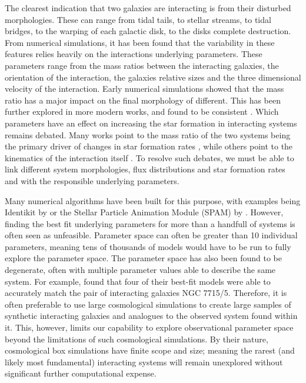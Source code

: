 The clearest indication that two galaxies are interacting is from their disturbed morphologies. These can range from tidal tails, to stellar streams, to tidal bridges, to the warping of each galactic disk, to the disks complete destruction. From numerical simulations, it has been found that the variability in these features relies heavily on the interactions underlying parameters. These parameters range from the mass ratios between the interacting galaxies, the orientation of the interaction, the galaxies relative sizes and the three dimensional velocity of the interaction. Early numerical simulations \citep[e.g][]{Toomre_72, White_78_Read, Wallin_90, Hernquist_93} showed that the mass ratio has a major impact on the final morphology of different. This has been further explored in more modern works, and found to be consistent \citep{Bournaud_05,Lotz_08, 2012ApJ...747...85X, 2023PASJ...75..986T}. Which parameters have an effect on increasing the star formation in interacting systems remains debated. Many works point to the mass ratio of the two systems being the primary driver of changes in star formation rates \citep{Knapen_15b, 2022MNRAS.516.4922R, 2023ApJ...953...91L}, while others point to the kinematics of the interaction itself \citep{2020MNRAS.499.4370M, Xu_21}. To resolve such debates, we must be able to link different system morphologies, flux distributions and star formation rates and with the responsible underlying parameters.

Many numerical algorithms have been built for this purpose, with examples being Identikit by \citet{Barnes_09} or the Stellar Particle Animation Module (SPAM) by \citet{Wallin_90}. However, finding the best fit underlying parameters for more than a handfull of systems is often seen as unfeasible. Parameter space can often be greater than 10 individual parameters, meaning tens of thousands of models would have to be run to fully explore the parameter space. The parameter space has also been found to be degenerate, often with multiple parameter values able to describe the same system. For example, \citet{Smith_10} found that four of their best-fit models were able to accurately match the pair of interacting galaxies NGC 7715/5. Therefore, it is often preferable to use large cosmological simulations \citep[e.g.][]{Schaye_15, Hopkins_18, Hani_20} to create large samples of synthetic interacting galaxies and analogues to the observed system found within it. This, however, limits our capability to explore observational parameter space beyond the limitations of such cosmological simulations. By their nature, cosmological box simulations have finite scope and size; meaning the rarest (and likely most fundamental) interacting systems will remain unexplored without significant further computational expense.

